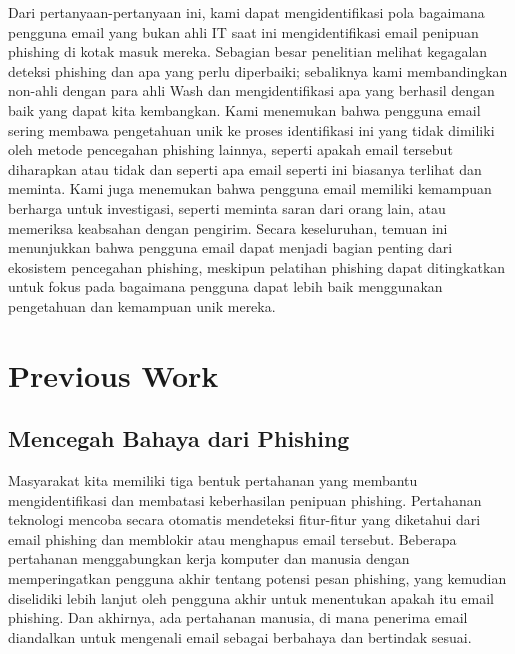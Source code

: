 \documentclass[lettersize,journal]{IEEEtran}
\begin{document}
Dari pertanyaan-pertanyaan ini, kami dapat mengidentifikasi pola bagaimana
pengguna email yang bukan ahli IT saat ini mengidentifikasi email penipuan
phishing di kotak masuk mereka. Sebagian besar penelitian melihat kegagalan
deteksi phishing dan apa yang perlu diperbaiki; sebaliknya kami membandingkan
non-ahli dengan para ahli Wash dan mengidentifikasi apa yang berhasil dengan
baik yang dapat kita kembangkan. Kami menemukan bahwa pengguna email sering
membawa pengetahuan unik ke proses identifikasi ini yang tidak dimiliki oleh
metode pencegahan phishing lainnya, seperti apakah email tersebut diharapkan
atau tidak dan seperti apa email seperti ini biasanya terlihat dan meminta.
Kami juga menemukan bahwa pengguna email memiliki kemampuan berharga untuk
investigasi, seperti meminta saran dari orang lain, atau memeriksa keabsahan
dengan pengirim. Secara keseluruhan, temuan ini menunjukkan bahwa pengguna
email dapat menjadi bagian penting dari ekosistem pencegahan phishing, meskipun
pelatihan phishing dapat ditingkatkan untuk fokus pada bagaimana pengguna dapat
lebih baik menggunakan pengetahuan dan kemampuan unik mereka.

\section{Previous Work}

\subsection{Mencegah Bahaya dari Phishing}
Masyarakat kita memiliki tiga bentuk pertahanan yang membantu mengidentifikasi dan membatasi keberhasilan penipuan phishing. Pertahanan teknologi mencoba secara otomatis mendeteksi fitur-fitur yang diketahui dari email phishing dan memblokir atau menghapus email tersebut. Beberapa pertahanan menggabungkan kerja komputer dan manusia dengan memperingatkan pengguna akhir tentang potensi pesan phishing, yang kemudian diselidiki lebih lanjut oleh pengguna akhir untuk menentukan apakah itu email phishing. Dan akhirnya, ada pertahanan manusia, di mana penerima email diandalkan untuk mengenali email sebagai berbahaya dan bertindak sesuai.
\end{document}
